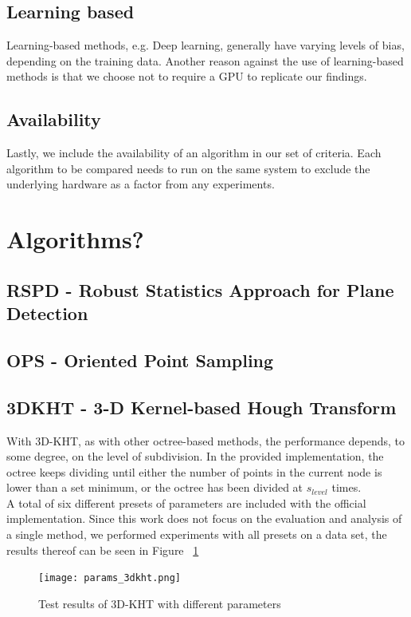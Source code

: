 \documentclass[main.tex]{subfiles}
\begin{document}
\subsection*{Learning based}\label{subsec_learning_based}
Learning-based methods, e.g. Deep learning, generally have varying levels of bias, depending on the training data.
Another reason against the use of learning-based methods is that we choose not to require a GPU to replicate our findings.

\subsection*{Availability}
Lastly, we include the availability of an algorithm in our set of criteria.
Each algorithm to be compared needs to run on the same system to exclude the underlying hardware as a factor from any experiments.\\

\section{Algorithms?}
\subsection*{RSPD - Robust Statistics Approach for Plane Detection}

\subsection*{OPS - Oriented Point Sampling}

\subsection*{3DKHT - 3-D Kernel-based Hough Transform}
With 3D-KHT, as with other octree-based methods, the performance depends, to some degree, on the level of subdivision.
In the provided implementation, the octree keeps dividing until either the number of points in the current node is lower than a set minimum, or the
octree has been divided at $s_{level}$ times.\\
A total of six different presets of parameters are included with the official implementation.
Since this work does not focus on the evaluation and analysis of a single method, we performed experiments with all presets on a data set, the
results thereof can be seen in Figure ~\ref{fig:3dkht_params}
\begin{figure}[!h]
    \centering
    \texttt{[image: params\_3dkht.png]}
    \caption{Test results of 3D-KHT with different parameters}
    \label{fig:3dkht_params}
\end{figure}
\end{document}
